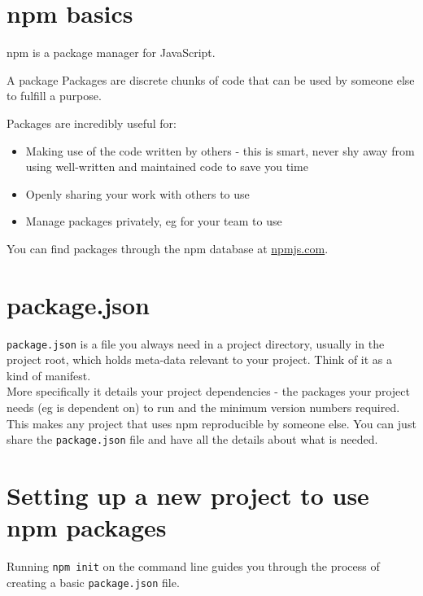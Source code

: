 \section{npm basics}

npm is a package manager for JavaScript.

\begin{infobox}{A package}
	Packages are discrete chunks of code that can be used by someone else to fulfill a purpose.
\end{infobox}

Packages are incredibly useful for:
\begin{itemize}
    \item Making use of the code written by others - this is smart, never shy away from using well-written and maintained code to save you time
	\item Openly sharing your work with others to use
	\item Manage packages privately, eg for your team to use
\end{itemize}

You can find packages through the npm database at \href{https://npmjs.com}{npmjs.com}.
\\

\section{package.json}

\texttt{package.json} is a file you always need in a project directory, usually in the project root, which holds meta-data relevant to your project. Think of it as a kind of manifest.
\\

More specifically it details your project dependencies - the packages your project needs (eg is dependent on) to run and the minimum version numbers required.
\\

This makes any project that uses npm reproducible by someone else. You can just share the \texttt{package.json} file and have all the details about what is needed.
\\


\section{Setting up a new project to use npm packages}

Running \texttt{npm init} on the command line guides you through the process of creating a basic \texttt{package.json} file.
\\

